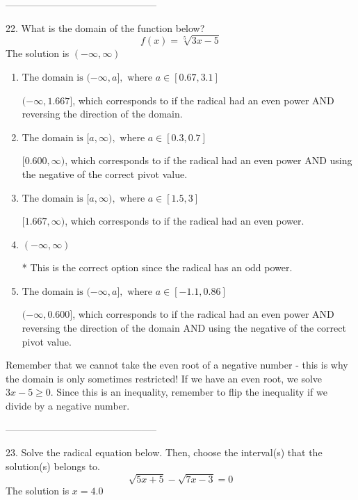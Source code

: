 \documentclass{extbook}[14pt]
\begin{document}
-----------------------------------------------

22. What is the domain of the function below?
\[ f(x) = \sqrt[5]{3 x - 5} \] 
The solution is $ (-\infty, \infty) $ 

\begin{enumerate}[label=\Alph*.] 
\item $ \text{The domain is } (-\infty, a], \text{   where } a \in [0.67, 3.1] $ 

 $(-\infty, 1.667]$, which corresponds to if the radical had an even power AND reversing the direction of the domain. 
\item $ \text{The domain is } [a, \infty), \text{   where } a \in [0.3, 0.7] $ 

 $[0.600, \infty)$, which corresponds to if the radical had an even power AND using the negative of the correct pivot value. 
\item $ \text{The domain is } [a, \infty), \text{   where } a \in [1.5, 3] $ 

 $[1.667, \infty)$, which corresponds to if the radical had an even power. 
\item $ (-\infty, \infty) $ 

 * This is the correct option since the radical has an odd power. 
\item $ \text{The domain is } (-\infty, a], \text{   where } a \in [-1.1, 0.86] $ 

 $(-\infty, 0.600]$, which corresponds to if the radical had an even power AND reversing the direction of the domain AND using the negative of the correct pivot value. 
\end{enumerate} 
 
Remember that we cannot take the even root of a negative number - this is why the domain is only sometimes restricted! If we have an even root, we solve $3 x - 5 \geq 0$. Since this is an inequality, remember to flip the inequality if we divide by a negative number.

-----------------------------------------------

23. Solve the radical equation below. Then, choose the interval(s) that the solution(s) belongs to.
\[ \sqrt{5 x + 5} - \sqrt{7 x - 3} = 0 \] 
The solution is $ x = 4.0 $ 
\end{document}
